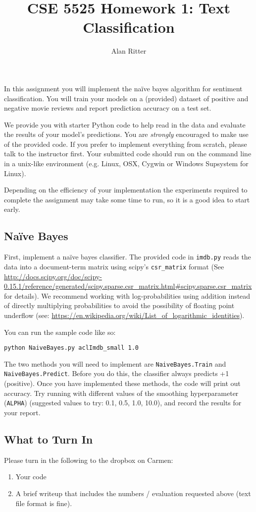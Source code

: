 \documentclass[12pt, letterpaper]{article}
\begin{document}
\title{CSE 5525 Homework 1: Text Classification}
\author{Alan Ritter}
\date{}
\maketitle
 
In this assignment you will implement the na\"{i}ve bayes algorithm for
sentiment classification.  You will train your models on a (provided) dataset of positive
and negative movie reviews and report prediction accuracy on a test set.

We provide you with starter Python code to help read in the data and evaluate the results of your model's predictions.
You are \emph{strongly} encouraged to make use of the provided code.  
If you prefer to implement everything from scratch, please talk to the instructor first.  Your submitted code
should run on the command line in a unix-like environment (e.g. Linux, OSX, Cygwin or Windows Supsystem for Linux).

Depending on the efficiency of your implementation the experiments required to complete the assignment may take some
time to run, so it is a good idea to start early.

\subsection*{Na\"{i}ve Bayes}
First, implement a na\"{i}ve bayes classifier.  The provided code in {\tt imdb.py} reads the data into a document-term matrix
using scipy's {\tt csr\_matrix} format (See \url{http://docs.scipy.org/doc/scipy-0.15.1/reference/generated/scipy.sparse.csr_matrix.html#scipy.sparse.csr_matrix} for details).
We recommend working with log-probabilities using addition instead of directly multiplying probabilities to avoid the possibility of floating point underflow (see: \url{https://en.wikipedia.org/wiki/List_of_logarithmic_identities}).

You can run the sample code like so:
\begin{verbatim}
python NaiveBayes.py aclImdb_small 1.0
\end{verbatim}

The two methods you will need to implement are {\tt NaiveBayes.Train} and {\tt NaiveBayes.Predict}.  Before you do this, the classifier always predicts +1 (positive).
Once you have implemented these methods, the code will print out accuracy.  Try running with different values of the smoothing hyperparameter ({\tt ALPHA}) (suggested values to try: 0.1, 0.5, 1.0, 10.0),
and record the results for your report.

\subsection*{What to Turn In}
Please turn in the following to the dropbox on Carmen:

\begin{enumerate}
  \item Your code
  \item A brief writeup that includes the numbers / evaluation requested above (text file format is fine).
\end{enumerate}
\end{document}
